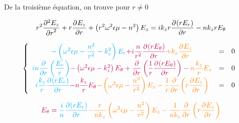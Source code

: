 De la troisième  équation, on trouve pour $r\not=0$

\begin{equation}
r^2 \ddr[2]{r}{E_z} + r\ddr{r}{E_z} + \left(r^2\w^2\eps\mu - n^2\right)E_z =ik_zr\ddr{r}{(rE_r)} -  nk_zrE_\theta
\end{equation}


\begin{equation}
    \left\lbrace
    \begin{array}{ccc}
        \color{cyan}{-\left(\w^2\eps\mu -\frac{n^2}{r^2}  - k_z^2\right)E_r}  \color{purple}{+i\frac{n}{r^2}\ddr{r}{(rE_\theta)}}  \color{orange}{+k_z\ddr{r}{E_z}} & = & 0
        \\
        \color{cyan}{in\ddr{r}{}\left(\frac{E_r}{r}\right)} \color{purple}{-\left(\w^2\eps\mu - k_z^2\right)E_\theta + \ddr{r}{}\left(\frac{1}{r}\ddr{r}{(rE_\theta)}\right)}  - \color{orange}{n\frac{k_z}{r}E_z} & = & 0
        \\
        \color{cyan}{i\frac{k_z}{r}\ddr{r}{(rE_r)}}  \color{purple}{- n\frac{k_z}{r}E_\theta}  \color{orange}{-\left(\w^2\eps\mu - \frac{n^2}{r^2} \right)E_z - \frac{1}{r}\ddr{r}{}\left(r\ddr{r}{E_z}\right)} & = & 0
    \end{array}
    \right.
\end{equation}

\begin{equation}
       \color{purple}{E_\theta} = \color{cyan}{\frac{i}{n}\ddr{r}{(rE_r)}}  \color{orange}{-\frac{r}{nk_z}\left(\w^2\eps\mu - \frac{n^2}{r^2} \right)E_z - \frac{1}{nk_z}\ddr{r}{}\left(r\ddr{r}{E_z}\right)}
\end{equation}
